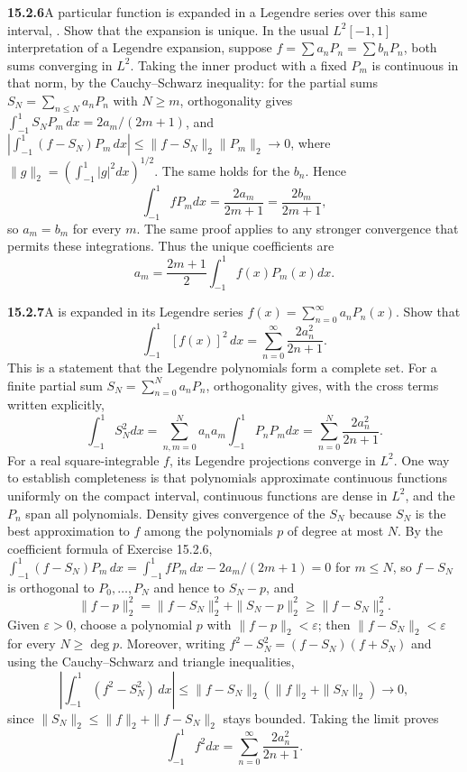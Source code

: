 \par\bigskip
\noindent\textbf{15.2.6}\quad A particular function  is
expanded in a Legendre series over this same interval,
. Show that the expansion is unique.
\solution
In the usual $L^2[-1,1]$ interpretation of a Legendre expansion,
suppose
$f=\sum a_nP_n=\sum b_nP_n$, both sums converging in $L^2$.
Taking the inner product with a fixed $P_m$ is continuous in that
norm, by the Cauchy--Schwarz inequality: for the partial sums
$S_N=\sum_{n\le N}a_nP_n$ with $N\ge m$, orthogonality gives
$\int_{-1}^1S_NP_m\,dx=2a_m/(2m+1)$, and
$|\int_{-1}^1(f-S_N)P_m\,dx|\le\|f-S_N\|_2\|P_m\|_2\to0$, where
$\|g\|_2=(\int_{-1}^1|g|^2dx)^{1/2}$.
The same holds for the $b_n$. Hence
\[
\int_{-1}^1fP_mdx=\frac{2a_m}{2m+1}
=\frac{2b_m}{2m+1},
\]
so $a_m=b_m$ for every $m$.
The same proof applies to any stronger convergence that permits
these integrations. Thus the unique coefficients are
\[
\boxed{a_m=\frac{2m+1}{2}\int_{-1}^1f(x)P_m(x)dx}.
\]

\par\bigskip
\noindent\textbf{15.2.7}\quad A  is expanded in
its  Legendre series
$f(x)=\displaystyle\sum_{n=0}^{\infty}a_{n}P_{n}(x)$. Show that
\[
\int_{-1}^{1}[f(x)]^{2}\,dx=\sum_{n=0}^{\infty}\frac{2a_{n}^{2}}{2n+1}.
\]
This is a statement that the Legendre polynomials form a complete set.
\solution
For a finite partial sum $S_N=\sum_{n=0}^Na_nP_n$, orthogonality
gives, with the cross terms written explicitly,
\[
\int_{-1}^1S_N^2dx
=\sum_{n,m=0}^Na_na_m\int_{-1}^1P_nP_mdx
=\sum_{n=0}^N\frac{2a_n^2}{2n+1}.
\]
For a real square-integrable $f$, its Legendre projections converge
in $L^2$. One way to establish completeness is that polynomials
approximate continuous functions uniformly on the compact interval,
continuous functions are dense in $L^2$, and the $P_n$ span all
polynomials. Density gives convergence of the $S_N$ because $S_N$ is
the best approximation to $f$ among the polynomials $p$ of degree at
most $N$. By the coefficient formula of Exercise 15.2.6,
$\int_{-1}^1(f-S_N)P_m\,dx=\int_{-1}^1fP_m\,dx-2a_m/(2m+1)=0$ for
$m\le N$, so $f-S_N$ is orthogonal to $P_0,\ldots,P_N$ and hence to
$S_N-p$, and
\[
\|f-p\|_2^2=\|f-S_N\|_2^2+\|S_N-p\|_2^2\ge\|f-S_N\|_2^2.
\]
Given $\varepsilon>0$, choose a polynomial $p$ with
$\|f-p\|_2<\varepsilon$; then $\|f-S_N\|_2<\varepsilon$ for every
$N\ge\deg p$. Moreover, writing $f^2-S_N^2=(f-S_N)(f+S_N)$ and using
the Cauchy--Schwarz and triangle inequalities,
\[
\left|\int_{-1}^1(f^2-S_N^2)\,dx\right|
\le\|f-S_N\|_2(\|f\|_2+\|S_N\|_2)\longrightarrow0,
\]
since $\|S_N\|_2\le\|f\|_2+\|f-S_N\|_2$ stays bounded.
Taking the limit proves
\[
\boxed{\int_{-1}^1f^2dx=\sum_{n=0}^\infty\frac{2a_n^2}{2n+1}}.
\]

